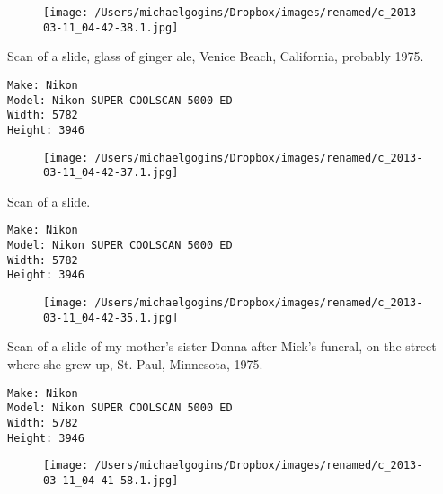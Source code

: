 \documentclass[11pt,letter,DIV=14,paper=landscape]{scrbook}
\begin{document}
\begin{figure}
\texttt{[image: /Users/michaelgogins/Dropbox/images/renamed/c\_2013-03-11\_04-42-38.1.jpg]}
\end{figure}
    
\clearpage
\noindent Scan of a slide, glass of ginger ale, Venice Beach, California, probably 1975.
\noindent
\begin{lstlisting}
Make: Nikon
Model: Nikon SUPER COOLSCAN 5000 ED
Width: 5782
Height: 3946
\end{lstlisting}
\clearpage

\begin{figure}
\texttt{[image: /Users/michaelgogins/Dropbox/images/renamed/c\_2013-03-11\_04-42-37.1.jpg]}
\end{figure}
    
\clearpage


\noindent Scan of a slide.
\noindent
\begin{lstlisting}
Make: Nikon
Model: Nikon SUPER COOLSCAN 5000 ED
Width: 5782
Height: 3946
\end{lstlisting}
\clearpage

\begin{figure}
\texttt{[image: /Users/michaelgogins/Dropbox/images/renamed/c\_2013-03-11\_04-42-35.1.jpg]}
\end{figure}
    
\clearpage
\noindent Scan of a slide of my mother's sister Donna after Mick's funeral, on the street where she grew up, St. Paul, Minnesota, 1975.
\noindent
\begin{lstlisting}
Make: Nikon
Model: Nikon SUPER COOLSCAN 5000 ED
Width: 5782
Height: 3946
\end{lstlisting}
\clearpage

\begin{figure}
\texttt{[image: /Users/michaelgogins/Dropbox/images/renamed/c\_2013-03-11\_04-41-58.1.jpg]}
\end{figure}
    
\end{document}

